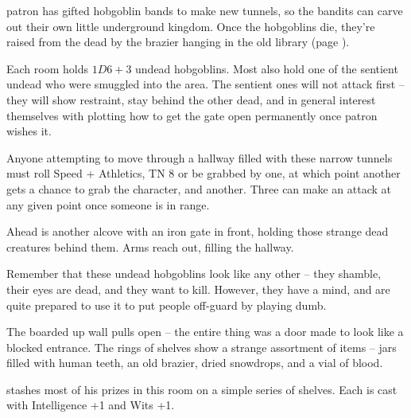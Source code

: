 \begin{multicols}{2}
\Gls{patron} has gifted hobgoblin bands to make new tunnels, so the bandits can carve out their own little underground kingdom.  Once the hobgoblins die, they're raised from the dead by the brazier hanging in the old library (page \pageref{oldlibrary}).

Each room holds $1D6+3$ undead hobgoblins.  Most also hold one of the sentient undead who were smuggled into the area.  The sentient ones will not attack first -- they will show restraint, stay behind the other dead, and in general interest themselves with plotting how to get the gate open permanently once \gls{patron} wishes it.



Anyone attempting to move through a hallway filled with these narrow tunnels must roll Speed + Athletics, TN 8 or be grabbed by one, at which point another gets a chance to grab the character, and another.  Three can make an attack at any given point once someone is in range.

\begin{boxtext}

	Ahead is another alcove with an iron gate in front, holding those strange dead creatures behind them.  Arms reach out, filling the hallway.

\end{boxtext}


Remember that these undead hobgoblins look like any other -- they shamble, their eyes are dead, and they want to kill.
However, they have a mind, and are quite prepared to use it to put people off-guard by playing dumb.



\begin{boxtext}

	The boarded up wall pulls open -- the entire thing was a door made to look like a blocked entrance.  The rings of shelves show a strange assortment of items -- jars filled with human teeth, an old brazier, dried snowdrops, and a vial of blood.

\end{boxtext}

 stashes most of his prizes in this room on a simple series of shelves.  Each is cast with Intelligence +1 and Wits +1.


\end{multicols}
